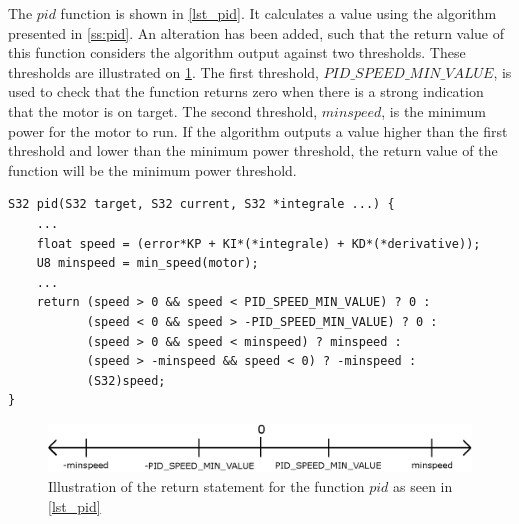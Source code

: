 The $pid$ function is shown in \cref{lst_pid}. It calculates a value using the algorithm presented in \cref{ss:pid}. An alteration has been added, such that the return value of this function considers the algorithm output against two thresholds.  These thresholds are illustrated on \cref{fig:pid_threshold}. The first threshold, $PID\_SPEED\_MIN\_VALUE$, is used to check that the function returns zero when there is a strong indication that the motor is on target. The second threshold, $minspeed$, is the minimum power for the motor to run. If the algorithm outputs a value higher than the first threshold and lower than the minimum power threshold, the return value of the function will be the minimum power threshold.
\begin{lstlisting}[language=inc_cpp, caption={The pid function}, label=lst_pid]
S32 pid(S32 target, S32 current, S32 *integrale ...) {
    ...
    float speed = (error*KP + KI*(*integrale) + KD*(*derivative));
    U8 minspeed = min_speed(motor);
    ...
    return (speed > 0 && speed < PID_SPEED_MIN_VALUE) ? 0 :
           (speed < 0 && speed > -PID_SPEED_MIN_VALUE) ? 0 :
           (speed > 0 && speed < minspeed) ? minspeed :
           (speed > -minspeed && speed < 0) ? -minspeed :
           (S32)speed;
}
\end{lstlisting}

\begin{figure}[H]
\includegraphics[scale=1]{graphics/speed_diagram.eps}
\caption{Illustration of the return statement for the function $pid$ as seen in \cref{lst_pid}}
\label{fig:pid_threshold}
\end{figure}

